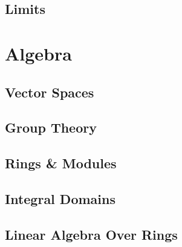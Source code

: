 \chapter{Limits}



\part{Algebra}

\chapter{Vector Spaces}

% 
% 
% 
% 
% 

% 
% 


% 
% 
% 
% 
% 

\chapter{Group Theory}







\chapter{Rings \& Modules}





\chapter{Integral Domains}



\chapter{Linear Algebra Over Rings}

